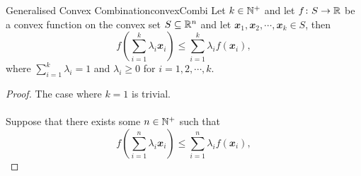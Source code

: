 \documentclass[math, code]{amznotes}
\theoremstyle{remark}
\begin{document}
\begin{probox}{Generalised Convex Combination}{convexCombi}
    Let $k \in \mathbb{N}^+$ and let $f \colon S \to \mathbb{R}$ be a convex function on the convex set $S \subseteq \mathbb{R}^n$ and let $\mathbfit{x}_1, \mathbfit{x}_2, \cdots, \mathbfit{x}_k \in S$, then 
    \begin{equation*}       
        f\left(\sum_{i = 1}^{k}\lambda_i\mathbfit{x}_i\right) \leq \sum_{i = 1}^{k}\lambda_i f(\mathbfit{x}_i),
    \end{equation*}     
    where $\sum_{i = 1}^{k}\lambda_i = 1$ and $\lambda_i \geq 0$ for $i = 1, 2, \cdots, k$.
    \tcblower
    \begin{proof}
        The case where $k = 1$ is trivial.
        \\\\
        Suppose that there exists some $n \in \mathbb{N}^+$ such that
        \begin{equation*}
            f\left(\sum_{i = 1}^{n}\lambda_i\mathbfit{x}_i\right) \leq \sum_{i = 1}^{n}\lambda_i f(\mathbfit{x}_i),
        \end{equation*}
    \end{proof}
\end{probox}
\end{document}
